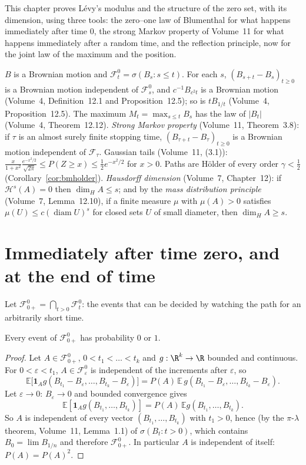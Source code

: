 This chapter proves L\'evy's modulus and the structure of the zero set, with its dimension, using three tools: the zero--one law of Blumenthal for what happens immediately
after time $0$, the strong Markov property of Volume~11 for what happens immediately after a random time, and the reflection principle, now for the joint law of the maximum
and the position.

\begin{reminder}
$B$ is a Brownian motion and $\mathcal F^0_t=\sigma(B_s:s\le t)$. For each $s$, $(B_{s+t}-B_s)_{t\ge0}$ is a Brownian motion independent of $\mathcal F^0_s$, and $c^{-1}B_{c^2t}$ is a Brownian motion
(Volume~4, Definition~12.1 and Proposition~12.5); so is $tB_{1/t}$ (Volume~4, Proposition~12.5). The maximum $M_t=\max_{s\le t}B_s$ has the law of $|B_t|$ (Volume~4, Theorem~12.12). \emph{Strong Markov property}
(Volume~11, Theorem~3.8): if $\tau$ is an almost surely finite stopping time, $(B_{\tau+t}-B_\tau)_{t\ge0}$ is a Brownian motion independent of $\mathcal F_\tau$. Gaussian tails (Volume~11, (3.1)):
$\frac x{1+x^2}\frac{e^{-x^2/2}}{\sqrt{2\pi}}\le P(Z\ge x)\le\frac12e^{-x^2/2}$ for $x>0$. Paths are H\"older of every order $\gamma<\frac12$ (Corollary~\ref{cor:bmholder}). \emph{Hausdorff dimension} (Volume~7, Chapter~12):
if $\mathcal H^s(A)=0$ then $\dim_HA\le s$; and by the \emph{mass distribution principle} (Volume~7, Lemma~12.10), if a finite measure $\mu$ with $\mu(A)>0$ satisfies $\mu(U)\le c(\operatorname{diam}U)^s$ for closed sets
$U$ of small diameter, then $\dim_HA\ge s$.
\end{reminder}

\section{Immediately after time zero, and at the end of time}

Let $\mathcal F^0_{0+}=\bigcap_{t>0}\mathcal F^0_t$: the events that can be decided by watching the path for an arbitrarily short time.

\begin{theorem}\label{thm:blumenthal}
Every event of $\mathcal F^0_{0+}$ has probability $0$ or $1$.
\end{theorem}

\begin{proof}
Let $A\in\mathcal F^0_{0+}$, $0<t_1<\dots<t_k$ and $g:\R^k\to\R$ bounded and continuous. For $0<\varepsilon<t_1$, $A\in\mathcal F^0_\varepsilon$ is independent of the increments after $\varepsilon$, so
\[
\mathbb E\bigl[\mathbf 1_Ag(B_{t_1}-B_\varepsilon,\dots,B_{t_k}-B_\varepsilon)\bigr]=P(A)\,\mathbb E\,g(B_{t_1}-B_\varepsilon,\dots,B_{t_k}-B_\varepsilon).
\]
Let $\varepsilon\to0$: $B_\varepsilon\to0$ and bounded convergence gives
\[\mathbb E[\mathbf 1_Ag(B_{t_1},\dots,B_{t_k})]=P(A)\,\mathbb E g(B_{t_1},\dots,B_{t_k}).\] So $A$ is independent of every vector
$(B_{t_1},\dots,B_{t_k})$ with $t_1>0$, hence (by the $\pi$-$\lambda$ theorem, Volume~11, Lemma~1.1) of $\sigma(B_t:t>0)$, which contains $B_0=\lim B_{1/n}$ and therefore $\mathcal F^0_{0+}$. In particular $A$ is
independent of itself: $P(A)=P(A)^2$.
\end{proof}

